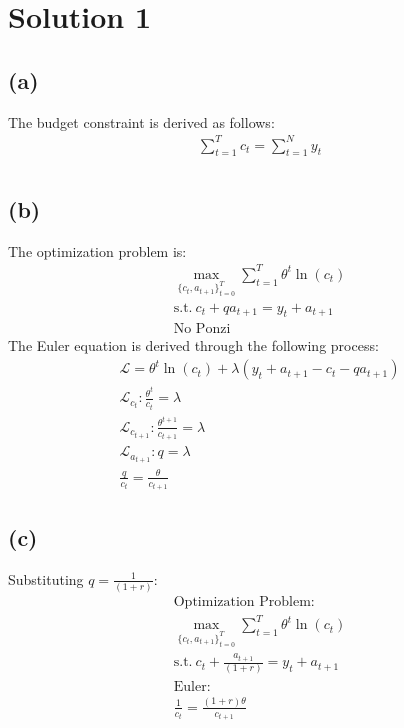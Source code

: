 \documentclass[10pt,a4paper]{article}
\newcommand{\sumt}{\sum\limits_{t=1}^{T}}
\newcommand{\sumn}{\sum\limits_{t=1}^{N}}
\begin{document}
\section*{Solution 1}
    \subsection*{(a)}
        The budget constraint is derived as follows:
        \begin{gather*}
            \sumt  c_t = \sumn  y_t\\
        \end{gather*}
    \subsection*{(b)}
        The optimization problem is:
        \begin{gather*}
            \max_{\{c_t,a_{t+1}\}_{t=0}^{T}}\sumt\theta^t\ln(c_t) \\
            \text{s.t.} \ c_t + qa_{t+1} = y_t + a_{t+1} \\
            \text{No Ponzi}
        \end{gather*}
        The Euler equation is derived through the following process:
        \begin{gather*}
            \mathcal{L} = \theta^t\ln(c_t) + \lambda(y_t + a_{t+1} - c_t - qa_{t+1}) \\
            \mathcal{L}_{c_t}: \frac{\theta^t}{c_t} = \lambda \\
            \mathcal{L}_{c_{t+1}}: \frac{\theta^{t+1}}{c_{t+1}} = \lambda \\
            \mathcal{L}_{a_{t+1}}: q = \lambda \\
            \frac{q}{c_t} = \frac{\theta}{c_{t+1}}
        \end{gather*}       
    \subsection*{(c)}
        Substituting $q = \frac{1}{(1+r)}$:
        \begin{gather*}
            \text{Optimization Problem:} \\
            \max_{\{c_t,a_{t+1}\}_{t=0}^{T}}\sumt\theta^t\ln(c_t) \\
            \text{s.t.} \ c_t + \frac{a_{t+1}}{(1+r)} = y_t + a_{t+1}\\
            \text{Euler:} \\
            \frac{1}{c_t} = \frac{(1+r)\theta}{c_{t+1}}
        \end{gather*}
\end{document}
